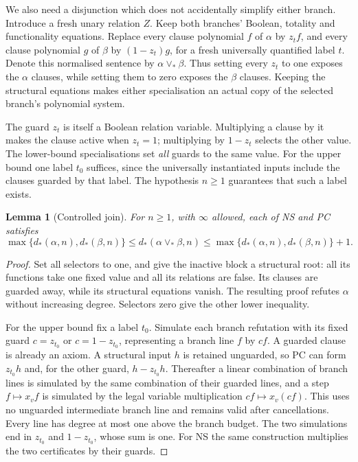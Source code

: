 \documentclass[11pt,a4paper,oneside,openany]{book}
\newtheorem{lemma}[theorem]{Lemma}
\theoremstyle{definition}\newtheorem{definition}[theorem]{Definition}
\theoremstyle{remark}\newtheorem{remark}[theorem]{Remark}
\newcommand{\join}{\mathbin{\vee_*}}
\numberwithin{equation}{chapter}
\begin{document}
We also need a disjunction which does not accidentally simplify either
branch. Introduce a fresh unary relation $Z$. Keep both branches' Boolean,
totality and functionality equations. Replace every clause polynomial $f$
of $\alpha$ by $z_t f$, and every clause polynomial $g$ of $\beta$ by
$(1-z_t)g$, for a fresh universally quantified label $t$. Denote this
normalised sentence by $\alpha\join\beta$.
Thus setting every $z_t$ to one exposes the $\alpha$ clauses, while
setting them to zero exposes the $\beta$ clauses. Keeping the structural
equations makes either specialisation an actual copy of the selected
branch's polynomial system.

The guard $z_t$ is itself a Boolean relation variable. Multiplying a
clause by it makes the clause active when $z_t=1$; multiplying by
$1-z_t$ selects the other value. The lower-bound specialisations set
\emph{all} guards to the same value. For the upper bound one label
$t_0$ suffices, since the universally instantiated inputs include the
clauses guarded by that label. The hypothesis $n\ge1$ guarantees that
such a label exists.

\begin{lemma}[Controlled join]\label{tx:lem:join}
For $n\ge1$, with $\infty$ allowed, each of NS and PC satisfies
\[
 \max\{d_*(\alpha,n),d_*(\beta,n)\}
 \le d_*(\alpha\join\beta,n)
 \le\max\{d_*(\alpha,n),d_*(\beta,n)\}+1.
\]
\end{lemma}
\begin{proof}
Set all selectors to one, and give the inactive block a structural root:
all its functions take one fixed value and all its relations are false.
Its clauses are guarded away, while its structural equations vanish.
The resulting proof refutes $\alpha$ without increasing degree. Selectors
zero give the other lower inequality.

For the upper bound fix a label $t_0$. Simulate each branch refutation
with its fixed guard $c=z_{t_0}$ or $c=1-z_{t_0}$, representing a branch
line $f$ by $cf$. A guarded clause is already an axiom. A structural
input $h$ is retained unguarded, so PC can form $z_{t_0}h$ and,
for the other guard, $h-z_{t_0}h$. Thereafter a linear combination of
branch lines is simulated by the same combination of their guarded
lines, and a step $f\mapsto x_vf$ is simulated by the legal variable
multiplication $cf\mapsto x_v(cf)$. This uses no unguarded intermediate
branch line and remains valid after cancellations. Every line has
degree at most one above the branch budget. The two simulations end
in $z_{t_0}$ and $1-z_{t_0}$, whose sum is one. For NS the same
construction multiplies the two certificates by their guards.
\end{proof}
\end{document}
